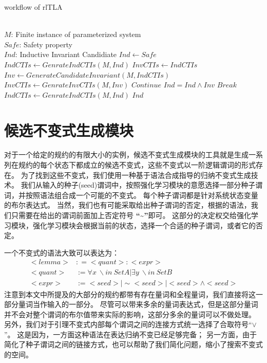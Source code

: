 \begin{algorithm}
    \caption[short]{workflow of rlTLA}
    \label{alg:rltla-workflow}
    
    \begin{algorithmic}[1]
        \REQUIRE \ \\
        $M$: Finite instance of parameterized system\\
        $Safe$: Safety property
		\ENSURE \ \\
        $Ind$: Inductive Invariant Candidiate
		\STATE $Ind \gets Safe$
        \STATE $IndCTIs \gets GenrateIndCTIs(M, Ind)$
            \STATE $InvCTIs \gets IndCTIs$
                \STATE $Inv \gets GenerateCandidateInvariant(M, IndCTIs)$
                \STATE $InvCTIs \gets GenrateInvCTIs(M, Inv)$
                    \STATE $Continue$
                \ENDIF
                    \STATE $Ind = Ind \wedge Inv$
                    \STATE $Break$
                \ENDIF
            \ENDWHILE
            \STATE $IndCTIs \gets GenrateIndCTIs(M, Ind)$
        \ENDWHILE
        \RETURN $Ind$
    \end{algorithmic}
\end{algorithm}

\section{候选不变式生成模块}

对于一个给定的规约的有限大小的实例，候选不变式生成模块的工具就是生成一系列在规约的每个状态下都成立的候选不变式，这些不变式以一阶逻辑谓词的形式存在。
为了找到这些不变式，我们使用一种基于语法合成指导的归纳不变式生成技术。
我们从输入的种子(seed)谓词中，按照强化学习模块的意愿选择一部分种子谓词，并按照语法组合成一个可能的不变式。
每个种子谓词都是针对系统状态变量的布尔表达式。
当然，我们也有可能采取给出种子谓词的否定，根据\TLA 的语法，我们只需要在给出的谓词前面加上否定符号 \textbf{“\~{}”}即可。
这部分的决定权交给强化学习模块，强化学习模块会根据当前的状态，选择一个合适的种子谓词，或者它的否定。

一个不变式的语法大致可以表达为：
\begin{align}
    <lemma> &: = <quant>:<expr>   \\
    <quant> &:= \forall x\ \backslash in\ SetA | \exists y\ \backslash in\ SetB \\
    <expr>  &:= <seed>| \sim<seed> | <seed> \wedge <seed>
\end{align}
注意到本文中所提及的大部分的\TLA 规约都带有存在量词和全程量词，我们直接将这一部分量词当作输入的一部分。
尽管可以带来多余的量词表达式，但是这部分量词并不会对整个谓词的布尔值带来实际的影响，这部分多余的量词可以不做处理。
另外，我们对于引理不变式内部每个谓词之间的连接方式统一选择了合取符号“$\vee$”。
这是因为，一方面这种语法在表达归纳不变已经足够完备\cite{or-complete}；
另一方面，由于简化了种子谓词之间的链接方式，也可以帮助了我们简化问题，缩小了搜索不变式的空间。


